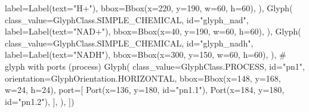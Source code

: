\documentclass[
  letterpaper,
  DIV=11,
  numbers=noendperiod]{scrartcl}
\newenvironment{Shaded}{\begin{snugshade}}{\end{snugshade}}
\newcommand{\BuiltInTok}[1]{\textcolor[rgb]{0.00,0.23,0.31}{#1}}
\newcommand{\CommentTok}[1]{\textcolor[rgb]{0.37,0.37,0.37}{#1}}
\newcommand{\DecValTok}[1]{\textcolor[rgb]{0.68,0.00,0.00}{#1}}
\newcommand{\NormalTok}[1]{\textcolor[rgb]{0.00,0.23,0.31}{#1}}
\newcommand{\OperatorTok}[1]{\textcolor[rgb]{0.37,0.37,0.37}{#1}}
\newcommand{\StringTok}[1]{\textcolor[rgb]{0.13,0.47,0.30}{#1}}
\begin{document}
\begin{Shaded}
\begin{Highlighting}[]
\NormalTok{        label}\OperatorTok{=}\NormalTok{Label(text}\OperatorTok{=}\StringTok{"H+"}\NormalTok{),}
\NormalTok{        bbox}\OperatorTok{=}\NormalTok{Bbox(x}\OperatorTok{=}\DecValTok{220}\NormalTok{, y}\OperatorTok{=}\DecValTok{190}\NormalTok{, w}\OperatorTok{=}\DecValTok{60}\NormalTok{, h}\OperatorTok{=}\DecValTok{60}\NormalTok{),}
\NormalTok{    ),}
\NormalTok{    Glyph(}
\NormalTok{        class\_value}\OperatorTok{=}\NormalTok{GlyphClass.SIMPLE\_CHEMICAL,}
        \BuiltInTok{id}\OperatorTok{=}\StringTok{"glyph\_nad"}\NormalTok{,}
\NormalTok{        label}\OperatorTok{=}\NormalTok{Label(text}\OperatorTok{=}\StringTok{"NAD+"}\NormalTok{),}
\NormalTok{        bbox}\OperatorTok{=}\NormalTok{Bbox(x}\OperatorTok{=}\DecValTok{40}\NormalTok{, y}\OperatorTok{=}\DecValTok{190}\NormalTok{, w}\OperatorTok{=}\DecValTok{60}\NormalTok{, h}\OperatorTok{=}\DecValTok{60}\NormalTok{),}
\NormalTok{    ),}
\NormalTok{    Glyph(}
\NormalTok{        class\_value}\OperatorTok{=}\NormalTok{GlyphClass.SIMPLE\_CHEMICAL,}
        \BuiltInTok{id}\OperatorTok{=}\StringTok{"glyph\_nadh"}\NormalTok{,}
\NormalTok{        label}\OperatorTok{=}\NormalTok{Label(text}\OperatorTok{=}\StringTok{"NADH"}\NormalTok{),}
\NormalTok{        bbox}\OperatorTok{=}\NormalTok{Bbox(x}\OperatorTok{=}\DecValTok{300}\NormalTok{, y}\OperatorTok{=}\DecValTok{150}\NormalTok{, w}\OperatorTok{=}\DecValTok{60}\NormalTok{, h}\OperatorTok{=}\DecValTok{60}\NormalTok{),}
\NormalTok{    ),}
    \CommentTok{\# glyph with ports (process)}
\NormalTok{    Glyph(}
\NormalTok{        class\_value}\OperatorTok{=}\NormalTok{GlyphClass.PROCESS,}
        \BuiltInTok{id}\OperatorTok{=}\StringTok{"pn1"}\NormalTok{,}
\NormalTok{        orientation}\OperatorTok{=}\NormalTok{GlyphOrientation.HORIZONTAL,}
\NormalTok{        bbox}\OperatorTok{=}\NormalTok{Bbox(x}\OperatorTok{=}\DecValTok{148}\NormalTok{, y}\OperatorTok{=}\DecValTok{168}\NormalTok{, w}\OperatorTok{=}\DecValTok{24}\NormalTok{, h}\OperatorTok{=}\DecValTok{24}\NormalTok{),}
\NormalTok{        port}\OperatorTok{=}\NormalTok{[}
\NormalTok{            Port(x}\OperatorTok{=}\DecValTok{136}\NormalTok{, y}\OperatorTok{=}\DecValTok{180}\NormalTok{, }\BuiltInTok{id}\OperatorTok{=}\StringTok{"pn1.1"}\NormalTok{),}
\NormalTok{            Port(x}\OperatorTok{=}\DecValTok{184}\NormalTok{, y}\OperatorTok{=}\DecValTok{180}\NormalTok{, }\BuiltInTok{id}\OperatorTok{=}\StringTok{"pn1.2"}\NormalTok{),}
\NormalTok{        ],}
\NormalTok{    ),}
\NormalTok{])}
\end{Highlighting}
\end{Shaded}
\end{document}
